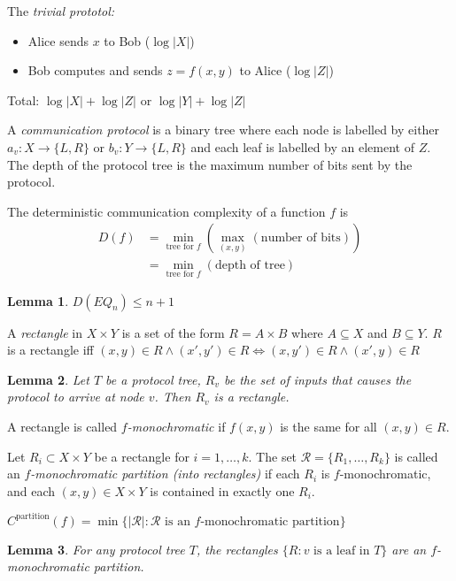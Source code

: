 \documentclass[letterpaper,landscape,11pt]{article}
\newtheorem{lemma}{Lemma}
\begin{document}
\noindent The \emph{trivial prototol:}
\begin{itemize}
	\item Alice sends $x$ to Bob ($\log |X|$)
	\item Bob computes and sends $z = f(x, y)$ to Alice ($\log |Z|$)
\end{itemize}
Total: $\log |X| + \log |Z|$ or $\log |Y| + \log |Z|$

A \emph{communication protocol} is a binary tree where each node is labelled by either $a_v : X \rightarrow \{L, R\}$ or $b_v : Y \rightarrow \{L, R\}$ and each leaf is labelled by an element of $Z$. The depth of the protocol tree is the maximum number of bits sent by the protocol.

The deterministic communication complexity of a function $f$ is
\begin{align*}
	D(f) & = \min\limits_{\text{tree for } f} \left(\max\limits_{(x, y)}(\text{number of bits}) \right) \\
	& = \min\limits_{\text{tree for } f} (\text{depth of tree})
\end{align*}

\begin{lemma}
	$D(EQ_n) \leq n + 1$
\end{lemma}

A \emph{rectangle} in $X \times Y$ is a set of the form $R = A \times B$ where $A \subseteq X$ and $B \subseteq Y$. $R$ is a rectangle iff $(x, y) \in R \land (x', y') \in R \Leftrightarrow (x, y') \in R \land (x', y) \in R$

\begin{lemma}
	Let $T$ be a protocol tree, $R_v$ be the set of inputs that causes the protocol to arrive at node $v$. Then $R_v$ is a rectangle.
\end{lemma}

A rectangle is called \emph{$f$-monochromatic} if $f(x, y)$ is the same for all $(x, y) \in R$.

Let $R_i \subset X \times Y$ be a rectangle for $i = 1, \dots, k$. The set $\mathcal{R} = \{R_1, \dots, R_k\}$ is called an \emph{$f$-monochromatic partition (into rectangles)} if each $R_i$ is $f$-monochromatic, and each $(x, y) \in X \times Y$ is contained in exactly one $R_i$.

$C^{\text{partition}}(f) = \min \{|\mathcal{R}| : \mathcal{R} \text{ is an }f\text{-monochromatic partition}\}$

\begin{lemma}
	For any protocol tree $T$, the rectangles $\{R : v \text{ is a leaf in } T\}$ are an $f$-monochromatic partition.
\end{lemma}
\end{document}
